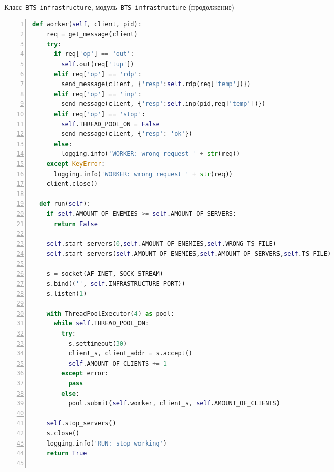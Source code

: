 \begin{ListingEnv}[p]\caption{Класс~\texttt{\small BTS_infrastructure}, модуль~\texttt{\small BTS_infrastructure} (продолжение)}\label{list:bts2}
	\begin{lstlisting}[language=Python, numbers=left]        
  def worker(self, client, pid):
    req = get_message(client)
    try:
      if req['op'] == 'out':
        self.out(req['tup'])
      elif req['op'] == 'rdp':
        send_message(client, {'resp':self.rdp(req['temp'])})
      elif req['op'] == 'inp':
        send_message(client, {'resp':self.inp(pid,req['temp'])})
      elif req['op'] == 'stop':
        self.THREAD_POOL_ON = False
        send_message(client, {'resp': 'ok'})
      else:
        logging.info('WORKER: wrong request ' + str(req))
    except KeyError:
      logging.info('WORKER: wrong request ' + str(req))
    client.close()
  
  def run(self):
    if self.AMOUNT_OF_ENEMIES >= self.AMOUNT_OF_SERVERS:
      return False
      
    self.start_servers(0,self.AMOUNT_OF_ENEMIES,self.WRONG_TS_FILE)
    self.start_servers(self.AMOUNT_OF_ENEMIES,self.AMOUNT_OF_SERVERS,self.TS_FILE)
    
    s = socket(AF_INET, SOCK_STREAM)
    s.bind(('', self.INFRASTRUCTURE_PORT))
    s.listen(1)
  
    with ThreadPoolExecutor(4) as pool:
      while self.THREAD_POOL_ON:
        try:
          s.settimeout(30)
          client_s, client_addr = s.accept()
          self.AMOUNT_OF_CLIENTS += 1
        except error:
          pass
        else:
          pool.submit(self.worker, client_s, self.AMOUNT_OF_CLIENTS)
  
    self.stop_servers()
    s.close()
    logging.info('RUN: stop working')
    return True
    
	\end{lstlisting}
\end{ListingEnv}
